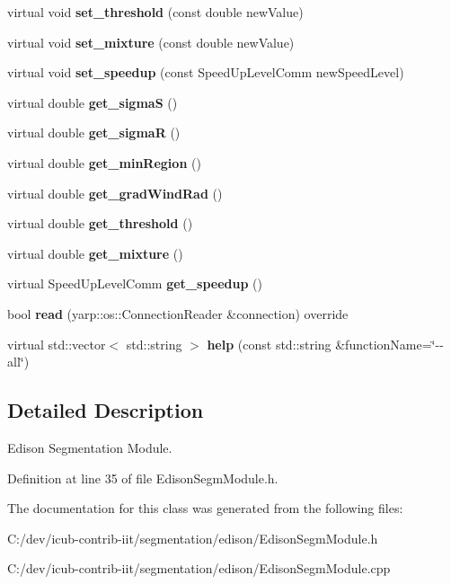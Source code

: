 \begin{DoxyCompactItemize}
virtual void {\bfseries set\+\_\+threshold} (const double new\+Value)
\item 
\mbox{\label{classEdisonSegmModule_a0993cc82cbd9dfb774e69e40a236787a}} 
virtual void {\bfseries set\+\_\+mixture} (const double new\+Value)
\item 
\mbox{\label{classEdisonSegmModule_af35d584ee6446611e1c483897c86f1fc}} 
virtual void {\bfseries set\+\_\+speedup} (const Speed\+Up\+Level\+Comm new\+Speed\+Level)
\item 
\mbox{\label{classEdisonSegmModule_a62aa5009cad7d09959ed5cdd8c358a90}} 
virtual double {\bfseries get\+\_\+sigmaS} ()
\item 
\mbox{\label{classEdisonSegmModule_ad1045be0e10cd0d40c81396f48e54b9a}} 
virtual double {\bfseries get\+\_\+sigmaR} ()
\item 
\mbox{\label{classEdisonSegmModule_ad61a5ccea53f415be9f2b76a8781689f}} 
virtual double {\bfseries get\+\_\+min\+Region} ()
\item 
\mbox{\label{classEdisonSegmModule_ab9ce5f24dd33f58d543b25ec0257af41}} 
virtual double {\bfseries get\+\_\+grad\+Wind\+Rad} ()
\item 
\mbox{\label{classEdisonSegmModule_a8e3ab7941df516f42357330a80d1e408}} 
virtual double {\bfseries get\+\_\+threshold} ()
\item 
\mbox{\label{classEdisonSegmModule_a58df44d5dbba062170e5e22f957da907}} 
virtual double {\bfseries get\+\_\+mixture} ()
\item 
\mbox{\label{classEdisonSegmModule_ae1f22b6113534640a3faedd22505932b}} 
virtual Speed\+Up\+Level\+Comm {\bfseries get\+\_\+speedup} ()
\item 
\mbox{\label{classSegmentationModule_a23b0718c2744b9f9a028a182a578f5b7}} 
bool {\bfseries read} (yarp\+::os\+::\+Connection\+Reader \&connection) override
\item 
\mbox{\label{classSegmentationModule_af5e7c395d563e6c9b170d509c2a01e0a}} 
virtual std\+::vector$<$ std\+::string $>$ {\bfseries help} (const std\+::string \&function\+Name=\char`\"{}-\/-\/all\char`\"{})
\end{DoxyCompactItemize}


\subsection{Detailed Description}
Edison Segmentation Module. 



Definition at line 35 of file Edison\+Segm\+Module.\+h.



The documentation for this class was generated from the following files\+:\begin{DoxyCompactItemize}
\item 
C\+:/dev/icub-\/contrib-\/iit/segmentation/edison/Edison\+Segm\+Module.\+h\item 
C\+:/dev/icub-\/contrib-\/iit/segmentation/edison/Edison\+Segm\+Module.\+cpp\end{DoxyCompactItemize}
